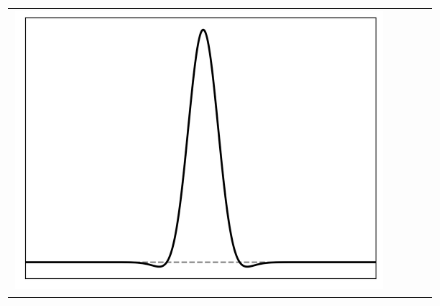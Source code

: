 \documentclass[10pt,final,xcolor=dvipsnames]{beamer}
\begin{document}
\begin{frame}
\begin{figure}
{\begin{tabular}{cccc}
	    \includegraphics[scale=0.2]{localpsf_revised_figures/ricker_1d_a=0.23.png} \\

\end{tabular}}
\end{figure}
\end{frame}
\end{document}

